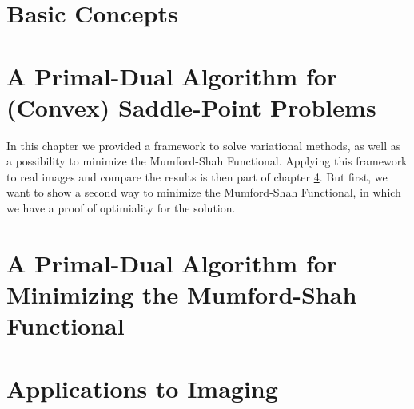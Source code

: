 \documentclass{scrreprt}
\begin{document}





\chapter{Basic Concepts} %
\label{cha:basic_concepts}

    
    
    


\chapter{A Primal-Dual Algorithm for (Convex) Saddle-Point Problems} %
\label{cha:a_first_order_primal_dual_algorithm_for_convex_saddle_point_problems}
    
    
    
    
    
    
    

    In this chapter we provided a framework to solve variational methods, as well as a possibility to minimize the Mumford-Shah Functional. Applying this framework to real images and compare the results is then part of chapter \ref{cha:applications_to_imaging}. But first, we want to show a second way to minimize the Mumford-Shah Functional, in which we have a proof of optimiality for the solution.


\chapter{A Primal-Dual Algorithm for Minimizing the Mumford-Shah Functional} %
\label{cha:a_first_order_primal_dual_algorithm_for_minimizing_the_mumford_shah_functional}
    


\chapter{Applications to Imaging} %
\label{cha:applications_to_imaging}
\end{document}
